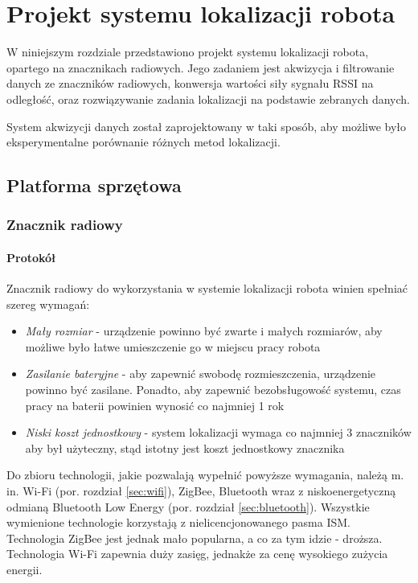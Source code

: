\chapter{Projekt systemu lokalizacji robota}
\label{ch:system}

W niniejszym rozdziale przedstawiono projekt systemu lokalizacji robota, opartego na znacznikach radiowych. Jego zadaniem jest akwizycja i filtrowanie danych ze znaczników radiowych, konwersja wartości siły sygnału RSSI na odległość, oraz rozwiązywanie zadania lokalizacji na podstawie zebranych danych. 

System akwizycji danych został zaprojektowany w taki sposób, aby możliwe było eksperymentalne porównanie różnych metod lokalizacji. 

\section{Platforma sprzętowa}
\label{sec:hardware}
\subsection{Znacznik radiowy}
\label{subsec:znacznik}

\subsubsection{Protokół}
Znacznik radiowy do wykorzystania w systemie lokalizacji robota winien spełniać szereg wymagań: 
\begin{itemize}
\item \textit{Mały rozmiar} - urządzenie powinno być zwarte i małych rozmiarów, aby możliwe było łatwe umieszczenie go w miejscu pracy robota
 \item \textit{Zasilanie bateryjne} - aby zapewnić swobodę rozmieszczenia, urządzenie powinno być zasilane. Ponadto, aby zapewnić bezobsługowość systemu, czas pracy na baterii powinien wynosić co najmniej 1 rok
 \item \textit{Niski koszt jednostkowy} - system lokalizacji wymaga co najmniej 3 znaczników aby był użyteczny, stąd istotny jest koszt jednostkowy znacznika
\end{itemize}

Do zbioru technologii, jakie pozwalają wypełnić powyższe wymagania, należą m. in. Wi-Fi (por. rozdział \ref{sec:wifi}), ZigBee, Bluetooth wraz z niskoenergetyczną odmianą Bluetooth Low Energy (por. rozdział \ref{sec:bluetooth}). Wszystkie wymienione technologie korzystają z nielicencjonowanego pasma ISM. Technologia ZigBee jest jednak mało popularna, a co za tym idzie - droższa. Technologia Wi-Fi zapewnia duży zasięg, jednakże za cenę wysokiego zużycia energii. 

